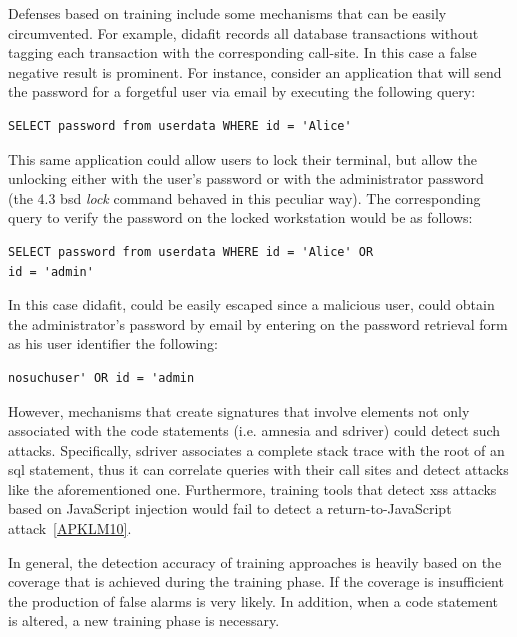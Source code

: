 \documentclass[conference]{IEEEtran}
\begin{document}
Defenses based on training include some mechanisms that can be easily
circumvented. For example, {\sc didafit} records all database
transactions without tagging each transaction with the
corresponding call-site. In this case a false negative result
is prominent. For instance, consider an application that will send the
password for a forgetful user via email by executing the following
query: \bgroup \lstset{language=SQL}
\begin{small}
\begin{lstlisting}
SELECT password from userdata WHERE id = 'Alice'
\end{lstlisting}
\end{small}
\egroup
\noindent
This same application could allow users to lock their terminal,
but allow the unlocking either with the user's password or with
the administrator password (the 4.3 {\sc bsd} {\em lock} command
behaved in this peculiar way).
The corresponding query to verify the password on the locked
workstation would be as follows:
\bgroup
\lstset{language=SQL}
\begin{small}
\begin{lstlisting}
SELECT password from userdata WHERE id = 'Alice' OR
id = 'admin'
\end{lstlisting}
\end{small}
\egroup
\noindent
In this case {\sc didafit}, could be easily escaped
since a malicious user, could obtain the administrator's password
by email by entering on the password retrieval form
as his user identifier the following:
\bgroup
\lstset{language=SQL}
\begin{small}
\begin{lstlisting}
nosuchuser' OR id = 'admin
\end{lstlisting}
\end{small}
\egroup
\noindent
However, mechanisms that create signatures that involve
elements not only associated with the code statements
(i.e. {\sc amnesia} and {\sc sd}river)
could detect such attacks. Specifically,
{\sc sd}river associates a complete stack trace with the
root of an {\sc sql} statement, thus it can correlate
queries with their call sites and detect attacks
like the aforementioned one.
Furthermore, training tools that detect
{\sc xss} attacks based on JavaScript injection
would fail to detect a return-to-JavaScript
attack~\ref{APKLM10}.

In general, the detection accuracy of training approaches is
heavily based on the coverage that is achieved during the
training phase. If the coverage is insufficient the
production of false alarms is very likely.
In addition, when a code statement is altered, a new
training phase is necessary.
\end{document}
